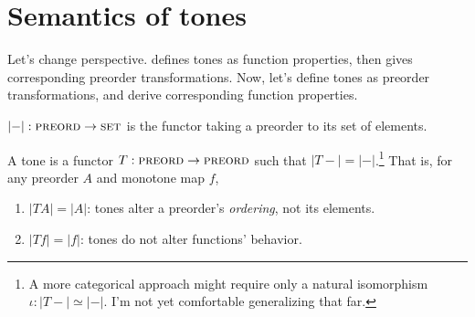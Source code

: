 \documentclass{rntz}
\newcommand{\cat}[1]{\textsc{#1}} %
\newcommand{\Pre}{\cat{preord}}
\newcommand{\Set}{\cat{set}}
\newcommand\isoto{\simeq}
\newcommand\opcolor{\color{ForestGreen}}
\newcommand\isocolor{\color{NavyBlue}}
\newcommand\id{\ensuremath{\mathrm{id}}}
\newcommand\op{\ensuremath{\mathrm{\opcolor op}}}
\newcommand\iso{\texorpdfstring{\ensuremath{{\isocolor\Box}}}{iso}}
\begin{document}





\section{Semantics of tones}

\newcommand{\elems}[1]{\ensuremath{|{#1}|}}
\newcommand{\elemsfn}[0]{\elems{-}}


Let's change perspective.  defines tones as function
pro\-per\-ties, then gives corresponding pre\-order trans\-form\-ations. Now,
let's define tones as preorder transformations, and derive corresponding
function properties.
\begin{definition}
  $\elemsfn : \Pre \to \Set$ is the functor taking a preorder to its set of
  elements.
\end{definition}

\begin{definition}[Tones]\label{def:tone}
  A tone is a functor $T : \Pre \to \Pre$ such that $\elems{T-} =
  \elemsfn$.\footnote{A more categorical approach might require only a natural
    isomorphism \(\iota : \elems{T-} \isoto \elemsfn\). I'm not yet comfortable
    generalizing that far.} That is, for any preorder $A$ and monotone map $f$,
  \begin{enumerate}
  \item $\elems{TA} = \elems{A}$: tones alter a preorder's
    \emph{ordering}, not its elements.
  \item $\elems{Tf} = \elems{f}$: tones do not alter functions'
    behavior.
  \end{enumerate}
\end{definition}
\end{document}
